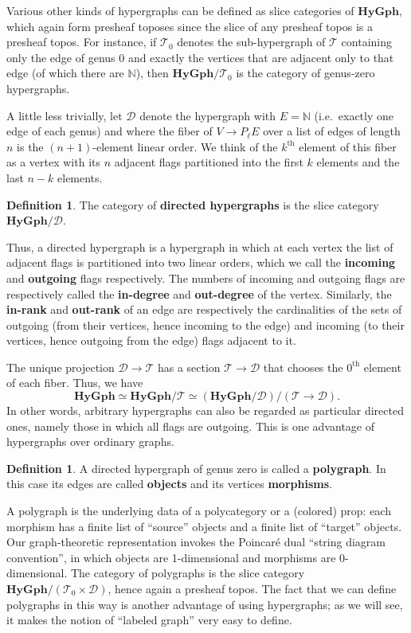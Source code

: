 \documentclass{article}
\theoremstyle{definition}
\newtheorem{defn}[thm]{Definition}
\theoremstyle{remark}
\def\N{\mathbb{N}}
\def\hy{\mathbf{HyGph}}
\def\thy{\mathcal{T}}
\def\dhy{\mathcal{D}}
\begin{document}
Various other kinds of hypergraphs can be defined as slice categories of $\hy$, which again form presheaf toposes since the slice of any presheaf topos is a presheaf topos.
For instance, if $\thy_0$ denotes the sub-hypergraph of $\thy$ containing only the edge of genus 0 and exactly the vertices that are adjacent only to that edge (of which there are $\N$), then $\hy/\thy_0$ is the category of genus-zero hypergraphs.

A little less trivially, let $\dhy$ denote the hypergraph with $E=\N$ (i.e.\ exactly one edge of each genus) and where the fiber of $V\to P_\ell E$ over a list of edges of length $n$ is the $(n+1)$-element linear order.
We think of the $k^{\mathrm{th}}$ element of this fiber as a vertex with its $n$ adjacent flags partitioned into the first $k$ elements and the last $n-k$ elements.

\begin{defn}
  The category of \textbf{directed hypergraphs} is the slice category $\hy/\dhy$.
\end{defn}

Thus, a directed hypergraph is a hypergraph in which at each vertex the list of adjacent flags is partitioned into two linear orders, which we call the \textbf{incoming} and \textbf{outgoing} flags respectively.
The numbers of incoming and outgoing flags are respectively called the \textbf{in-degree} and \textbf{out-degree} of the vertex.
Similarly, the \textbf{in-rank} and \textbf{out-rank} of an edge are respectively the cardinalities of the sets of outgoing (from their vertices, hence incoming to the edge) and incoming (to their vertices, hence outgoing from the edge) flags adjacent to it.

The unique projection $\dhy\to\thy$ has a section $\thy\to\dhy$ that chooses the $0^{\mathrm{th}}$ element of each fiber.
Thus, we have
\[\hy \simeq \hy/\thy \simeq (\hy/\dhy)/(\thy\to\dhy).\]
In other words, arbitrary hypergraphs can also be regarded as particular directed ones, namely those in which all flags are outgoing.
This is one advantage of hypergraphs over ordinary graphs.

\begin{defn}
  A directed hypergraph of genus zero is called a \textbf{polygraph}.
  In this case its edges are called \textbf{objects} and its vertices \textbf{morphisms}.
\end{defn}

A polygraph is the underlying data of a polycategory or a (colored) prop: each morphism has a finite list of ``source'' objects and a finite list of ``target'' objects.
Our graph-theoretic representation invokes the Poincar\'e dual ``string diagram convention'', in which objects are 1-dimensional and morphisms are 0-dimensional.
The category of polygraphs is the slice category $\hy/(\thy_0\times\dhy)$, hence again a presheaf topos.
The fact that we can define polygraphs in this way is another advantage of using hypergraphs; as we will see, it makes the notion of ``labeled graph'' very easy to define.
\end{document}

